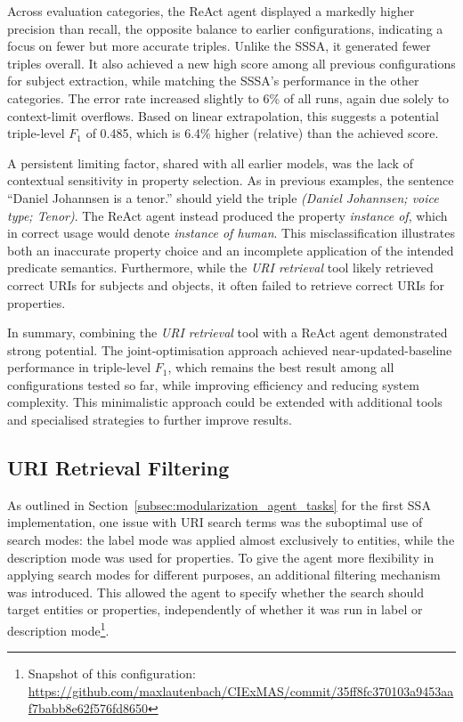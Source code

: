 \documentclass[a4paper,oneside,bibliography=totoc]{scrbook}
\begin{document}
Across evaluation categories, the ReAct agent displayed a markedly higher precision than recall, the opposite balance to earlier configurations, indicating a focus on fewer but more accurate triples. Unlike the \ac{SSSA}, it generated fewer triples overall. It also achieved a new high score among all previous configurations for subject extraction, while matching the \ac{SSSA}’s performance in the other categories. The error rate increased slightly to 6\% of all runs, again due solely to context-limit overflows. Based on linear extrapolation, this suggests a potential triple-level $F_{1}$ of 0.485, which is 6.4\% higher (relative) than the achieved score.

A persistent limiting factor, shared with all earlier models, was the lack of contextual sensitivity in property selection. As in previous examples, the sentence \enquote{Daniel Johannsen is a tenor.} should yield the triple \textit{(Daniel Johannsen; voice type; Tenor)}. The ReAct agent instead produced the property \textit{instance of}, which in correct usage would denote \textit{instance of human}. This misclassification illustrates both an inaccurate property choice and an incomplete application of the intended predicate semantics. Furthermore, while the \textit{URI retrieval} tool likely retrieved correct URIs for subjects and objects, it often failed to retrieve correct URIs for properties.

In summary, combining the \textit{URI retrieval} tool with a ReAct agent demonstrated strong potential. The joint-optimisation approach achieved near-updated-baseline performance in triple-level $F_{1}$, which remains the best result among all configurations tested so far, while improving efficiency and reducing system complexity. This minimalistic approach could be extended with additional tools and specialised strategies to further improve results.

\subsection{URI Retrieval Filtering}
\label{subsec:uri_retrieval_filtering}

As outlined in Section~\ref{subsec:modularization_agent_tasks} for the first \ac{SSA} implementation, one issue with URI search terms was the suboptimal use of search modes: the label mode was applied almost exclusively to entities, while the description mode was used for properties. To give the agent more flexibility in applying search modes for different purposes, an additional filtering mechanism was introduced. This allowed the agent to specify whether the search should target entities or properties, independently of whether it was run in label or description mode\footnote{Snapshot of this configuration: \url{https://github.com/maxlautenbach/CIExMAS/commit/35ff8fc370103a9453aaf7babb8e62f576fd8650}}.
\end{document}

